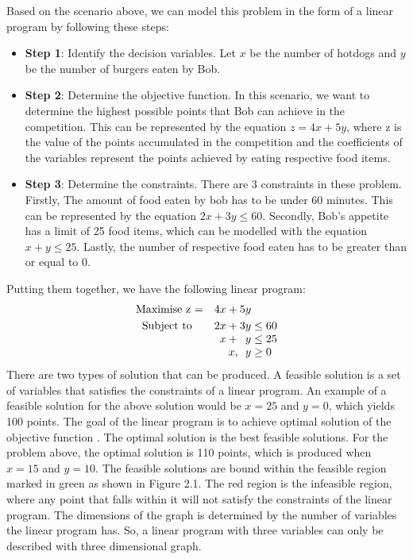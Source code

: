 Based on the scenario above, we can model this problem in the form of a linear program by following these steps:
\begin{itemize}
\item \textbf{Step 1}: Identify the decision variables. Let \(x\) be the number of hotdogs and \(y\) be the number
of burgers eaten by Bob.
\item \textbf{Step 2}: Determine the objective function. In this scenario, we want to determine the highest possible
points that Bob can achieve in the competition. This can be represented by the equation \(z = 4x + 5y\), where
z is the value of the points accumulated in the competition and the coefficients of the variables represent the points achieved by eating respective
food items.
\item \textbf{Step 3}: Determine the constraints. There are 3 constraints in these problem. Firstly, The amount of
food eaten by bob has to be under 60 minutes. This can be represented by the equation \(2x + 3y \leq 60\). Secondly,
Bob's appetite has a limit of 25 food items, which can be modelled with the equation \(x + y \leq 25\). Lastly,
the number of respective food eaten has to be greater than or equal to 0.
\end{itemize}
Putting them together, we have the following linear program:
\[
  \begin{array}{r@{}r@{}l}
    \text{Maximise z =} \quad &{}4x + 5y \\[\jot]
    \text{Subject to}\qquad &{} 2x +   3y &{} \leq 60 \\
    \qquad &{} x +   \phantom{2}y &{} \leq 25 \\
    \qquad &{} x ,   \phantom{2}y &{} \geq 0 \\
  \end{array}
\]
There are two types of solution that can be produced. A feasible solution is a set of variables that satisfies the constraints
of a linear program. An example of a feasible solution for the above solution would be \(x = 25\) and \(y=0\), which yields 100 points.
The goal of the linear program is to achieve optimal solution of the objective function \cite{LPChvatal}. The optimal solution is the best feasible solutions.
For the problem above, the optimal solution is 110 points, which is produced when \(x = 15\) and \(y = 10\). The feasible solutions
are bound within the feasible region marked in green as shown in Figure 2.1. The red region is the infeasible region, where any point that falls within it will not satisfy the
constraints of the linear program. The dimensions of the graph is determined by the number of variables the linear program has.
So, a linear program with three variables can only be described with three dimensional graph.

